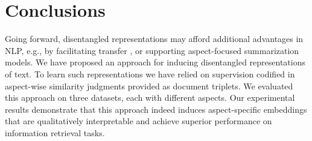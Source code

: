 \documentclass[11pt,a4paper]{article}
\begin{document}

\vspace{-.25em}
\section{Conclusions}
\vspace{-.5em}
Going forward, disentangled representations may afford additional advantages in NLP, e.g., by facilitating transfer \cite{zhang2017aspect}, or supporting aspect-focused summarization models. 
We have proposed an approach for inducing disentangled representations of text. To learn such representations we have relied on supervision codified in aspect-wise similarity judgments provided as document triplets. We evaluated this approach on three datasets, each with different aspects. Our experimental results demonstrate that this approach indeed induces aspect-specific embeddings that are qualitatively interpretable and achieve superior performance on information retrieval tasks. 



\end{document}

